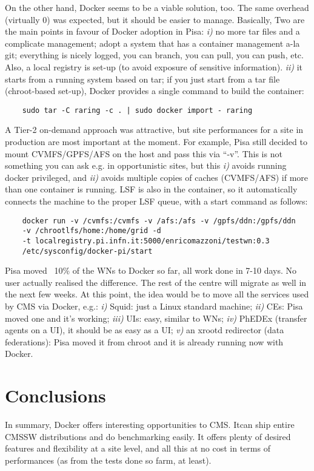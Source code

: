 \documentclass{PoS}
\begin{document}
On the other hand, Docker seems to be a viable solution, too. The same overhead (virtually 0) was expected, but it should be easier to manage. Basically, Two are the main points in favour of Docker adoption in Pisa: {\em i)} no more tar files and a complicate management;
adopt a system that has a container management a-la git; everything is nicely logged, you can branch, you can pull, you can push, etc. Also, a local registry is set-up (to avoid exposure of sensitive information). {\em ii)} it starts from a running system based on tar; if you just start from a tar file (chroot-based set-up), Docker provides a single command to build the container:
%
\begin{verbatim}
    sudo tar -C raring -c . | sudo docker import - raring
\end{verbatim}
%
A Tier-2 on-demand approach was attractive, but site performances for a site in production are most important at the moment. For example, Pisa still decided to mount CVMFS/GPFS/AFS on the host and pass this via ``-v''. This is not something you can ask e.g. in opportunistic sites, but this {\em i)} avoids running docker privileged, and {\em ii)}
avoids multiple copies of caches (CVMFS/AFS) if more than one container is running. LSF is also in the container, so it automatically connects the machine to the proper LSF queue, with a start command as follows:
%
\begin{verbatim}
    docker run -v /cvmfs:/cvmfs -v /afs:/afs -v /gpfs/ddn:/gpfs/ddn
    -v /chrootlfs/home:/home/grid -d
    -t localregistry.pi.infn.it:5000/enricomazzoni/testwn:0.3
    /etc/sysconfig/docker-pi/start
\end{verbatim}
%
Pisa moved ~10\% of the WNs to Docker so far, all work done in 7-10 days. No user actually realised the difference. The rest of the centre will migrate as well in the next few weeks. At this point, the idea would be to move all the services used by CMS via Docker, e.g.: {\em i)} Squid: just a Linux standard machine; {\em ii)} CEs: Pisa moved one and it’s working; {\em iii)} UIs: easy, similar to WNs; {\em iv)} PhEDEx (transfer agents on a UI), it should be as easy as a UI; {\em v)} an xrootd redirector (data federations): Pisa moved it from chroot and it is already running now with Docker.


\section{Conclusions}

In summary, Docker offers interesting opportunities to CMS. Itcan ship entire CMSSW distributions and do benchmarking easily. It offers plenty of desired features and flexibility at a site level, and all this at no cost in terms of performances (as from the tests done so farm, at least).
\end{document}
